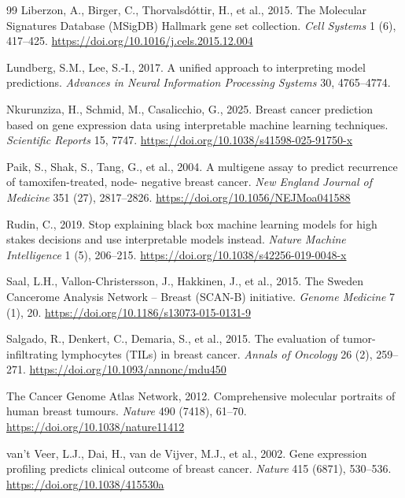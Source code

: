 \documentclass[review,12pt]{elsarticle}
\begin{document}
\begin{thebibliography}{99}
Liberzon, A., Birger, C., Thorvalsd\'{o}ttir, H., et al., 2015.
The Molecular Signatures Database (MSigDB) Hallmark gene set collection.
\emph{Cell Systems} 1 (6), 417--425.
\url{https://doi.org/10.1016/j.cels.2015.12.004}

Lundberg, S.M., Lee, S.-I., 2017.
A unified approach to interpreting model predictions.
\emph{Advances in Neural Information Processing Systems} 30, 4765--4774.

Nkurunziza, H., Schmid, M., Casalicchio, G., 2025.
Breast cancer prediction based on gene expression data using
interpretable machine learning techniques.
\emph{Scientific Reports} 15, 7747.
\url{https://doi.org/10.1038/s41598-025-91750-x}

Paik, S., Shak, S., Tang, G., et al., 2004.
A multigene assay to predict recurrence of tamoxifen-treated, node-
negative breast cancer.
\emph{New England Journal of Medicine} 351 (27), 2817--2826.
\url{https://doi.org/10.1056/NEJMoa041588}

Rudin, C., 2019.
Stop explaining black box machine learning models for high stakes
decisions and use interpretable models instead.
\emph{Nature Machine Intelligence} 1 (5), 206--215.
\url{https://doi.org/10.1038/s42256-019-0048-x}

Saal, L.H., Vallon-Christersson, J., Hakkinen, J., et al., 2015.
The Sweden Cancerome Analysis Network -- Breast (SCAN-B) initiative.
\emph{Genome Medicine} 7 (1), 20.
\url{https://doi.org/10.1186/s13073-015-0131-9}

Salgado, R., Denkert, C., Demaria, S., et al., 2015.
The evaluation of tumor-infiltrating lymphocytes (TILs) in breast cancer.
\emph{Annals of Oncology} 26 (2), 259--271.
\url{https://doi.org/10.1093/annonc/mdu450}

The Cancer Genome Atlas Network, 2012.
Comprehensive molecular portraits of human breast tumours.
\emph{Nature} 490 (7418), 61--70.
\url{https://doi.org/10.1038/nature11412}

van't Veer, L.J., Dai, H., van de Vijver, M.J., et al., 2002.
Gene expression profiling predicts clinical outcome of breast cancer.
\emph{Nature} 415 (6871), 530--536.
\url{https://doi.org/10.1038/415530a}

\end{thebibliography}
\end{document}
